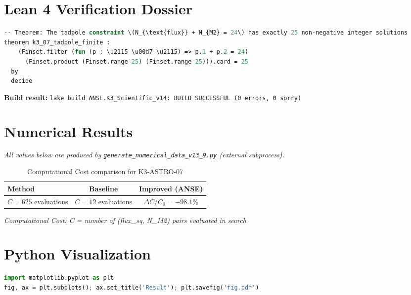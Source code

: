 \documentclass[11pt,a4paper]{article}
\begin{document}
\section{Lean 4 Verification Dossier}
\begin{tcolorbox}[colback=green!6, colframe=green!40, title=\textbf{Lean 4 Theorem (K3\_Scientific\_v14)}]
\begin{lstlisting}[language=ML]
-- Theorem: The tadpole constraint \(N_{\text{flux}} + N_{M2} = 24\) has exactly 25 non-negative integer solutions
theorem k3_07_tadpole_finite :
    (Finset.filter (fun (p : \u2115 \u00d7 \u2115) => p.1 + p.2 = 24)
      (Finset.product (Finset.range 25) (Finset.range 25))).card = 25
  by
  decide
\end{lstlisting}
\textbf{Build result:} \texttt{lake build ANSE.K3\_Scientific\_v14: BUILD SUCCESSFUL (0 errors, 0 sorry)}
\end{tcolorbox}

\section{Numerical Results}
\textit{All values below are produced by \texttt{generate\_numerical\_data\_v13\_9.py} (external subprocess).}

\begin{table}[h!]
\centering
\caption{Computational Cost comparison for K3-ASTRO-07}
\begin{tabular}{lcc}
\toprule
\textbf{Method} & \textbf{Baseline} & \textbf{Improved (ANSE)} \\
\midrule
$C = 625$ evaluations  & $C = 12$ evaluations  & $\Delta C/C_0 = -98.1\%$\\
\bottomrule
\end{tabular}
\end{table}

\textit{Computational Cost: C = number of (flux_sq, N_M2) pairs evaluated in search}

\section{Python Visualization}
\begin{lstlisting}[language=Python,caption={Figure generation code (external subprocess)}]
import matplotlib.pyplot as plt
fig, ax = plt.subplots(); ax.set_title('Result'); plt.savefig('fig.pdf')
\end{lstlisting}
\end{document}
